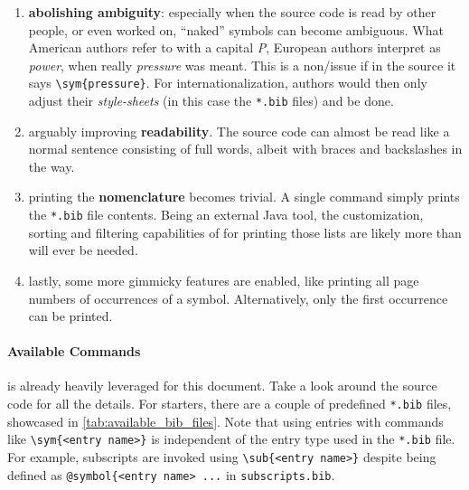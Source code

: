 \begin{enumerate}
          Yet, what is \emph{meant} is \emph{emphasis}; italic text is just what it
          happens to look like now, but it is not the \emph{meaning}.
          For example, we could later decide to redefine emphasized text to bold,
          or colored.
          If you previously did not differentiate strictly enough between
          \verb|\emph| and \verb|\textit|, you are in for a bad time.
          This is a trap beginners unfortunately often fall into.
          Using , abstracted markup\-/commands can be
          taken to a whole next level, leveraging this core \LaTeX{} strength.
    \item \textbf{abolishing ambiguity}:
          especially when the source code is read by other people, or even worked on,
          \enquote{naked} symbols can become ambiguous.
          What American authors refer to with a capital \emph{P}, European authors
          interpret as \emph{power}, when really \emph{pressure} was meant.
          This is a non\-/issue if in the source it says \verb|\sym{pressure}|.
          For internationalization, authors would then only adjust their
          \emph{style-sheets} (in this case the \texttt{*.bib} files) and be done.
    \item arguably improving \textbf{readability}.
          The source code can almost be read like a normal sentence consisting of full
          words, albeit with braces and backslashes in the way.
    \item printing the \textbf{nomenclature} becomes trivial.
          A single command simply prints the \texttt{*.bib} file contents.
          Being an external Java tool, the customization, sorting and filtering
          capabilities of  for printing those lists are likely
          more than will ever be needed.
    \item lastly, some more gimmicky features are enabled, like printing all
          page numbers of occurrences of a symbol.
          Alternatively, only the first occurrence can be printed.
\end{enumerate}

\paragraph{Available Commands}
 is already heavily leveraged for this document.
Take a look around the source code for all the details.
For starters, there are a couple of predefined \texttt{*.bib} files, showcased in
\cref{tab:available_bib_files}.
Note that using entries with commands like \verb|\sym{<entry name>}| is independent
of the entry type used in the \texttt{*.bib} file.
For example, subscripts are invoked using \verb|\sub{<entry name>}| despite being
defined as \verb|@symbol{<entry name> ...| in \texttt{subscripts.bib}.

